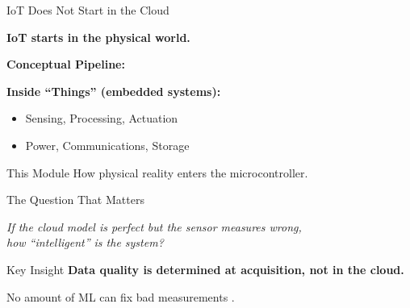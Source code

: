 \documentclass[aspectratio=169,11pt]{beamer}
\begin{document}
\begin{frame}{IoT Does Not Start in the Cloud}
    \begin{center}
        \Large
        \textbf{IoT starts in the physical world.}
    \end{center}
    
    \vspace{0.5cm}
    \textbf{Conceptual Pipeline:}
    \begin{center}
    \end{center}
    
    \vspace{0.3cm}
    \textbf{Inside ``Things'' (embedded systems):}
    \begin{itemize}
        \item Sensing, Processing, Actuation
        \item Power, Communications, Storage
    \end{itemize}
    
    \begin{block}{This Module}
        How physical reality enters the microcontroller.
    \end{block}
\end{frame}

\begin{frame}{The Question That Matters}
    \begin{center}
        \Large
        \textit{If the cloud model is perfect but the sensor measures wrong,\\
        how ``intelligent'' is the system?}
    \end{center}
    
    \vspace{1cm}
    \begin{alertblock}{Key Insight}
        \textbf{Data quality is determined at acquisition, not in the cloud.}
        
        No amount of ML can fix bad measurements \cite{sculley2015hidden}.
    \end{alertblock}
\end{frame}
\end{document}
